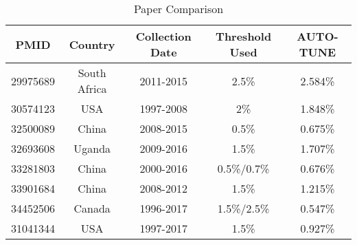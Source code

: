\documentclass[utf8]{FrontiersinHarvard} %
\begin{document}
\begin{table}[ht]
\caption{Paper Comparison}
\vspace{10pt}
\centering
\label{tab:paperComparison}
\begin{tabular}{|c|c|c|c|c|}
\hline
PMID & Country & Collection Date & Threshold Used & AUTO-TUNE \\
\hline
29975689 & South Africa & 2011-2015 & 2.5\% & 2.584\% \\
30574123 & USA & 1997-2008 & 2\% & 1.848\% \\
32500089 & China & 2008-2015 & 0.5\% & 0.675\% \\
32693608 & Uganda & 2009-2016 & 1.5\% & 1.707\% \\
33281803 & China & 2000-2016 & 0.5\%/0.7\% & 0.676\% \\
33901684 & China & 2008-2012 & 1.5\% & 1.215\% \\
34452506 & Canada & 1996-2017 & 1.5\%/2.5\% & 0.547\% \\
31041344 & USA & 1997-2017 & 1.5\% & 0.927\% \\
\hline
\end{tabular}
\end{table}
\end{document}
